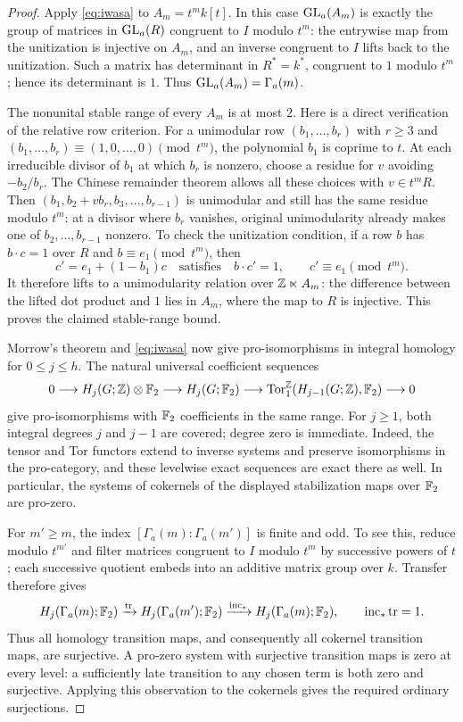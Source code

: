 \begin{proof}
Apply \eqref{eq:iwasa} to $A_m=t^m k[t]$. In this case
$\operatorname{GL}_a(A_m)$ is exactly the group of matrices in $\operatorname{GL}_a(R)$ congruent
to $I$ modulo $t^m$: the entrywise map from the unitization is injective
on $A_m$, and an inverse congruent to $I$ lifts back to the unitization.
Such a matrix has determinant in $R^*=k^*$, congruent to $1$ modulo $t^m$;
hence its determinant is $1$. Thus $\operatorname{GL}_a(A_m)=\Gamma_a(m)$.

The nonunital stable range of every $A_m$ is at most $2$. Here is a direct
verification of the relative row criterion. For a unimodular row
$(b_1,\ldots,b_r)$ with $r\ge3$ and $(b_1,\ldots,b_r)\equiv(1,0,\ldots,0)
\pmod{t^m}$, the polynomial $b_1$ is coprime to $t$. At each irreducible
divisor of $b_1$ at which $b_r$ is nonzero, choose a residue for $v$ avoiding
$-b_2/b_r$. The Chinese remainder theorem allows all these choices with
$v\in t^mR$. Then
$(b_1,b_2+vb_r,b_3,\ldots,b_{r-1})$ is unimodular and still has the same
residue modulo $t^m$: at a divisor where $b_r$ vanishes, original
unimodularity already makes one of $b_2,\ldots,b_{r-1}$ nonzero.
To check the unitization condition, if a row $b$
has $b\cdot c=1$ over $R$ and $b\equiv e_1\pmod{t^m}$, then
\[
 c'=e_1+(1-b_1)c
 \quad\text{satisfies}\quad b\cdot c'=1,
 \qquad c'\equiv e_1\pmod{t^m}.
\]
It therefore lifts to a unimodularity relation over $\mathbb Z\ltimes A_m$:
the difference between the lifted dot product and $1$ lies in $A_m$,
where the map to $R$ is injective.
This proves the claimed stable-range bound.

Morrow's theorem and \eqref{eq:iwasa} now give pro-isomorphisms in integral
homology for $0\le j\le h$. The natural universal coefficient sequences
\[
 0\longrightarrow H_j(G;\mathbb Z)\otimes\mathbb F_2
 \longrightarrow H_j(G;\mathbb F_2)
 \longrightarrow\operatorname{Tor}_1^{\mathbb Z}(H_{j-1}(G;\mathbb Z),\mathbb F_2)
 \longrightarrow0
\]
give pro-isomorphisms with $\mathbb F_2$ coefficients in the same range. For
$j\ge1$, both integral degrees $j$ and $j-1$ are covered; degree zero
is immediate. Indeed,
the tensor and Tor functors extend to inverse systems and preserve
isomorphisms in the pro-category, and these levelwise exact sequences
are exact there as well. In particular, the systems of cokernels of the
displayed stabilization maps over $\mathbb F_2$ are pro-zero.

For $m'\ge m$, the index $[\Gamma_a(m):\Gamma_a(m')]$ is finite and odd.
To see this, reduce modulo $t^{m'}$ and filter matrices congruent to $I$
modulo $t^m$ by successive powers of $t$; each successive quotient embeds
into an additive matrix group over $k$. Transfer therefore gives
\[
 H_j(\Gamma_a(m);\mathbb F_2)\xrightarrow{\operatorname{tr}}
 H_j(\Gamma_a(m');\mathbb F_2)\xrightarrow{\operatorname{inc}_*}
 H_j(\Gamma_a(m);\mathbb F_2),
 \qquad \operatorname{inc}_*\operatorname{tr}=1.
\]
Thus all homology transition maps, and consequently all cokernel
transition maps, are surjective. A pro-zero system with surjective
transition maps is zero at every level: a sufficiently late transition
to any chosen term is both zero and surjective. Applying this observation
to the cokernels gives the required ordinary surjections.
\end{proof}

